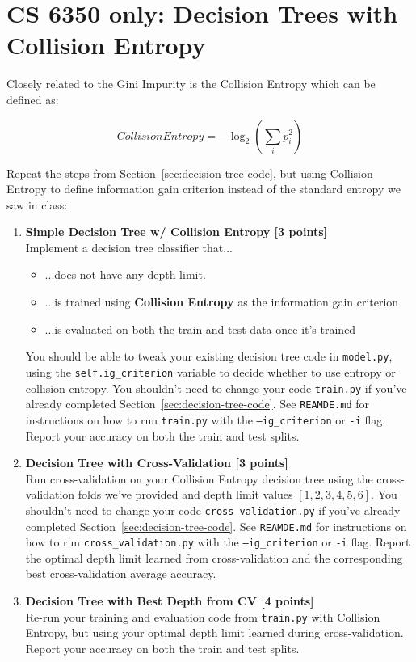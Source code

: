 \section{CS 6350 only: Decision Trees with Collision Entropy}
\label{sec:decision-tree-code-collision}

Closely related to the Gini Impurity  is the Collision Entropy which can be defined as:

\[
  CollisionEntropy = -\log_2\left(\sum_i p_i^2\right) 
\]

Repeat the steps from Section~\ref{sec:decision-tree-code}, but using Collision Entropy
to define information gain criterion instead of the standard entropy we saw in class:

\begin{enumerate}\itemsep0em
  \item \textbf{Simple Decision Tree w/ Collision Entropy [3 points]}\\
    Implement a decision tree classifier that...
    \begin{itemize}\itemsep0em
      \item ...does not have any depth limit.
      \item ...is trained using \textbf{Collision Entropy} as the information gain criterion
      \item ...is evaluated on both the train and test data once it's trained
    \end{itemize}
    You should be able to tweak your existing decision tree code in \texttt{model.py}, using the \texttt{self.ig\_criterion} variable to decide whether to use entropy or collision entropy.
    You shouldn't need to change your code \texttt{train.py} if you've already completed Section~\ref{sec:decision-tree-code}.
    See \texttt{REAMDE.md} for instructions on how to run \texttt{train.py} with the \texttt{--ig\_criterion} or \texttt{-i} flag.
    Report your accuracy on both the train and test splits.

\item \textbf{Decision Tree with Cross-Validation [3 points]}\\
    Run cross-validation on your Collision Entropy decision tree using the cross-validation folds we've provided and depth limit values $[1,2,3,4,5,6]$.
    You shouldn't need to change your code \texttt{cross\_validation.py} if you've already completed Section~\ref{sec:decision-tree-code}.
    See \texttt{REAMDE.md} for instructions on how to run \texttt{cross\_validation.py} with the \texttt{--ig\_criterion} or \texttt{-i} flag.
    Report the optimal depth limit learned from cross-validation and the corresponding best cross-validation average accuracy.

\item \textbf{Decision Tree with Best Depth from CV [4 points]}\\
    Re-run your training and evaluation code from \texttt{train.py} with Collision Entropy, but using your optimal depth limit learned during cross-validation.
    Report your accuracy on both the train and test splits.
\end{enumerate}

